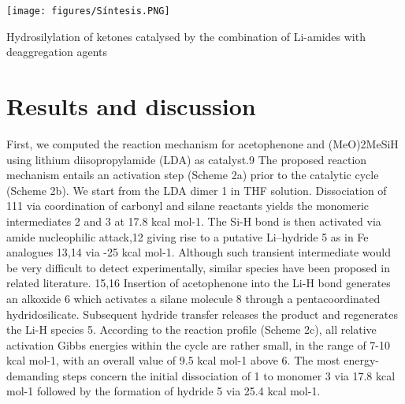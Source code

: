 \documentclass[journal=jacsat,manuscript=article]{achemso}
\begin{document}
	\begin{scheme}[h]
		\texttt{[image: figures/Síntesis.PNG]}
		\centering
		\caption{Hydrosilylation of ketones catalysed by the combination of	Li-amides with deaggregation agents}
		\centering
		\label{Scheme1}
	\end{scheme}	
	
	
	\section{Results and discussion}
	First, we computed the reaction mechanism for acetophenone and (MeO)2MeSiH using lithium diisopropylamide (LDA) as catalyst.9 The proposed reaction mechanism entails an activation step (Scheme 2a) prior to the catalytic cycle (Scheme 2b). We start from the LDA dimer 1 in THF solution. Dissociation of 111 via coordination of carbonyl and silane reactants yields the monomeric intermediates 2 and 3 at 17.8 kcal mol-1. The Si-H bond is then activated via amide nucleophilic attack,12 giving rise to a putative Li–hydride 5 as in Fe analogues 13,14 via -25 kcal mol-1. Although such transient intermediate would be very difficult to detect experimentally, similar species have been proposed in related literature. 15,16 Insertion of acetophenone into the Li-H bond generates an alkoxide 6 which activates a silane molecule 8 through a pentacoordinated hydridosilicate. Subsequent	hydride transfer releases the product and regenerates the Li-H species 5. According to the reaction profile (Scheme 2c), all relative activation Gibbs energies within the cycle are rather small, in the range of 7-10 kcal mol-1, with an overall value of 9.5 kcal mol-1 above 6. The most energy-demanding steps concern the initial dissociation of 1 to monomer 3 via 17.8 kcal mol-1 followed by the formation of hydride 5 via 25.4 kcal mol-1.
	
\end{document}
